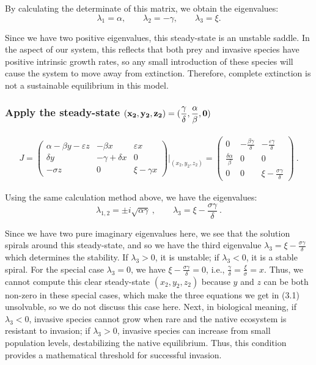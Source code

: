 \documentclass{article}
\begin{document}
\noindent By calculating the determinate of this matrix, we obtain the eigenvalues:
$$\lambda_1 = \alpha, \qquad \lambda_2 = -\gamma, \qquad \lambda_3 = \xi.$$

\noindent Since we have two positive eigenvalues, this steady-state is an unstable saddle. In the aspect of our system, this reflects that both prey and invasive species have positive intrinsic growth rates, so any small introduction of these species will cause the system to move away from extinction. Therefore, complete extinction is not a sustainable equilibrium in this model.


\subsubsection*{Apply the steady-state $\bf(x_2,y_2,z_2) = (\dfrac{\gamma}{\delta}, \dfrac{\alpha}{\beta}, 0)$}
\begin{align}
J = \begin{pmatrix}
\alpha - \beta y - \varepsilon z & -\beta x & \varepsilon x \\
\delta y & -\gamma + \delta x  & 0\\
- \sigma z & 0 & \xi - \gamma x
\end{pmatrix}\Big|_{(x_2,y_2,z_2)}
= \begin{pmatrix}
0 & -\frac{\beta \gamma}{\delta} & -\frac{\varepsilon \gamma}{\delta} \\
\frac{\delta \alpha}{\beta} & 0 & 0\\
0 & 0 & \xi - \frac{\sigma \gamma}{\delta}
\end{pmatrix} \ .
\tag{3.2}
\end{align}

\noindent Using the same calculation method above, we have the eigenvalues: 
$$\lambda_{1,2} = \pm i \sqrt{\alpha \gamma}\ , \qquad \lambda_3 = \xi - \frac{\sigma \gamma}{\delta} \ .$$

\noindent Since we have two pure imaginary eigenvalues here, we see that the solution spirals around this steady-state, and so we have the third eigenvalue $\lambda_3 = \xi - \frac{\sigma \gamma}{\delta}$ which determines the stability. If $\lambda_3 > 0$, it is unstable; if $\lambda_3 < 0$, it is a stable spiral. For the special case $\lambda_3 = 0$, we have $\xi - \frac{\sigma \gamma}{\delta} = 0$, i.e., $\frac{\gamma}{\delta} = \frac{\xi}{\sigma} = x$. Thus, we cannot compute this clear steady-state $(x_2,y_2,z_2)$ because $y$ and $z$ can be both non-zero in these special cases, which make the three equations we get in (3.1) unsolvable, so we do not discuss this case here. Next, in biological meaning, if $\lambda_3 < 0$, invasive species cannot grow when rare and the native ecosystem is resistant to invasion; if $\lambda_3 > 0$, invasive species can increase from small population levels, destabilizing the native equilibrium. Thus, this condition provides a mathematical threshold for successful invasion.
\end{document}
